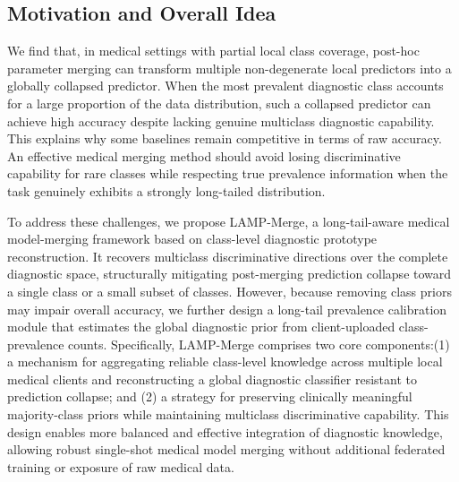 \documentclass[letterpaper]{article} %
\begin{document}
\subsection{Motivation and Overall Idea}

We find that, in medical settings with partial local class coverage, post-hoc parameter merging can transform multiple non-degenerate local predictors into a globally collapsed predictor. When the most prevalent diagnostic class accounts for a large proportion of the data distribution, such a collapsed predictor can achieve high accuracy despite lacking genuine multiclass diagnostic capability. This explains why some baselines remain competitive in terms of raw accuracy. An effective medical merging method should avoid losing discriminative capability for rare classes while respecting true prevalence information when the task genuinely exhibits a strongly long-tailed distribution.

To address these challenges, we propose LAMP-Merge, a long-tail-aware medical model-merging framework based on class-level diagnostic prototype reconstruction. It recovers multiclass discriminative directions over the complete diagnostic space, structurally mitigating post-merging prediction collapse toward a single class or a small subset of classes. However, because removing class priors may impair overall accuracy, we further design a long-tail prevalence calibration module that estimates the global diagnostic prior from client-uploaded class-prevalence counts. Specifically, LAMP-Merge comprises two core components:(1) a mechanism for aggregating reliable class-level knowledge across multiple local medical clients and reconstructing a global diagnostic classifier resistant to prediction collapse; and (2) a strategy for preserving clinically meaningful majority-class priors while maintaining multiclass discriminative capability. This design enables more balanced and effective integration of diagnostic knowledge, allowing robust single-shot medical model merging without additional federated training or exposure of raw medical data.
\end{document}
